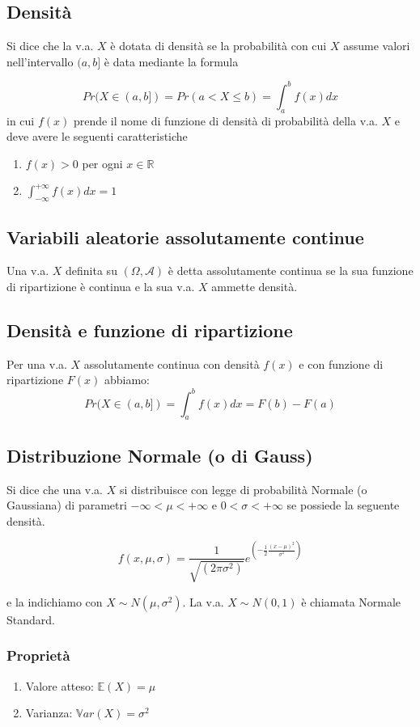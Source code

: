 \documentclass[a4paper]{report}
\begin{document}
  \subsection{Densità}
  Si dice che la v.a. $X$ è dotata di densità se la probabilità con cui $X$ assume valori nell'intervallo $(a,b]$ è data mediante la formula

  \[ Pr(X \in (a,b]) = Pr(a < X \leq b) = \int_{a}^{b} f(x)  dx \]
  in cui $f(x)$ prende il nome di funzione di densità di probabilità della v.a. $X$ e deve avere le seguenti caratteristiche
  \begin{enumerate}
    \item $f(x) > 0$ per ogni $x \in \mathbb{R}$
    \item $\int_{-\infty}^{+\infty} f(x) dx = 1$
  \end{enumerate}

  \subsection{Variabili aleatorie assolutamente continue}
  Una v.a. $X$ definita su $(\Omega, \mathcal{A})$ è detta assolutamente continua se la sua funzione di ripartizione è continua e la sua v.a. $X$ ammette densità.

  \subsection{Densità e funzione di ripartizione}
  Per una v.a. $X$ assolutamente continua con densità $f(x)$ e con funzione di ripartizione $F(x)$ abbiamo:
  \[ Pr(X \in (a,b]) = \int_{a}^{b} f(x) dx = F(b) - F(a) \]

  \subsection{Distribuzione Normale (o di Gauss)}
  Si dice che una v.a. $X$ si distribuisce con legge di probabilità Normale (o Gaussiana) di parametri $-\infty < \mu < +\infty$ e $ 0 < \sigma < +\infty$ se possiede la seguente densità.

  \[ f(x,\mu,\sigma) = \frac{1}{\sqrt{(2 \pi \sigma^2)}} e^{( -\frac{1}{2} \frac{(x-\mu)^2}{\sigma^2})} \]

  e la indichiamo con $X \sim N(\mu, \sigma^2)$. La v.a. $X \sim N(0,1)$ è chiamata Normale Standard.

  \subsubsection{Proprietà}
  \begin{enumerate}
    \item Valore atteso: $\mathbb{E}(X) = \mu$
    \item Varianza: $\mathbb{V}ar(X) = \sigma^2$
  \end{enumerate}
\end{document}
